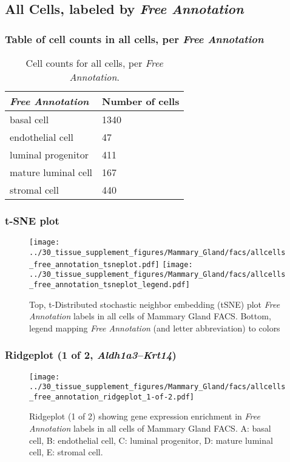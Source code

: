 \clearpage

\subsection{All Cells, labeled by \emph{Free Annotation}}
\subsubsection{Table of cell counts in all cells, per \emph{Free Annotation}}\begin{table}[h]
\centering
\label{my-label}
\begin{tabular}{@{}ll@{}}
\toprule

\emph{Free Annotation}& Number of cells \\ \midrule
basal cell & 1340 \\

endothelial cell & 47 \\

luminal progenitor & 411 \\

mature luminal cell & 167 \\

stromal cell & 440 \\
\bottomrule
\end{tabular}
\caption{Cell counts for all cells, per \emph{Free Annotation}.}
\end{table}

\clearpage
\subsubsection{t-SNE plot}
\begin{figure}[h]
\centering
\texttt{[image: ../30\_tissue\_supplement\_figures/Mammary\_Gland/facs/allcells\_free\_annotation\_tsneplot.pdf]}
\texttt{[image: ../30\_tissue\_supplement\_figures/Mammary\_Gland/facs/allcells\_free\_annotation\_tsneplot\_legend.pdf]}
\caption{Top, t-Distributed stochastic neighbor embedding (tSNE) plot  \emph{Free Annotation} labels in all cells of Mammary Gland FACS. Bottom, legend mapping \emph{Free Annotation} (and letter abbreviation) to colors}
\end{figure}


\clearpage

\subsubsection{Ridgeplot (1 of 2, \emph{Aldh1a3}--\emph{Krt14})}
\begin{figure}[h]
\centering
\texttt{[image: ../30\_tissue\_supplement\_figures/Mammary\_Gland/facs/allcells\_free\_annotation\_ridgeplot\_1-of-2.pdf]}

\caption{ Ridgeplot (1 of 2)  showing gene expression enrichment in \emph{Free Annotation} labels in all cells of Mammary Gland FACS. A: basal cell, B: endothelial cell, C: luminal progenitor, D: mature luminal cell, E: stromal cell.}
\end{figure}


